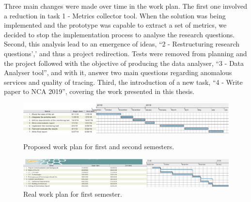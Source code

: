 Three main changes were made over time in the work plan. The first one involved a reduction in task 1 - Metrics collector tool. When the solution was being implemented and the prototype was capable to extract a set of metrics, we decided to stop the implementation process to analyse the research questions. Second, this analysis lead to an emergence of ideas, ``2 - Restructuring research questions',' and thus a project redirection. Tests were removed from planning and the project followed with the objective of producing the data analyser, ``3 - Data Analyser tool'', and with it, answer two main questions regarding anomalous services and quality of tracing. Third, the introduction of a new task, ``4 - Write paper to NCA 2019'', covering the work presented in this thesis.


\begin{landscape}
    \begin{figure}
        \includegraphics[height=0.234\textwidth]{images/proposed_work_plan_semester_1_and_2.pdf}
        \caption{Proposed work plan for first and second semesters.}
        \label{fig:proposed_work_plan_semester_1_and_2}
        \includegraphics[height=0.3\textwidth]{images/real_work_plan_semester_1.pdf}
        \caption{Real work plan for first semester.}
        \label{fig:real_work_plan_semester_1}
    \end{figure}
\end{landscape}

